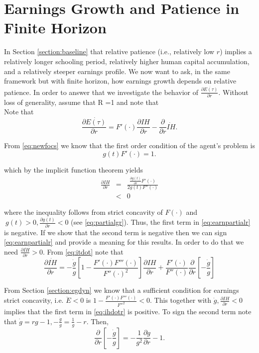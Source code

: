  
\section{Earnings Growth and Patience in Finite Horizon}
In Section \ref{section:baseline} that relative patience (i.e., relatively low $r$) implies a relatively longer schooling period, relatively higher human capital accumulation, and a relatively steeper earnings profile. We now want to ask, in the same framework but with finite horizon, how earnings growth depends on relative patience. In order to answer that we investigate the behavior of $\frac{\partial \dot{E(\tau)}}{\partial r}$. Without loss of generality, assume that R =1 and note that\\
\indent Note that
\begin{equation}
\frac{\partial \dot{E(\tau)} }{\partial r} = F'(\cdot) \frac{\partial IH}{\partial r} - \frac{\partial}{\partial r} \dot{IH}. \label{eq:earnpartialr}
\end{equation}

\noindent From \eqref{eq:newfocs} we know that the first order condition of the agent's problem is
\begin{equation}
g(t) F'(\cdot) = 1.
\end{equation}

\noindent which by the implicit function theorem yields
\begin{eqnarray}
\frac{\partial IH}{\partial r} &=& \frac{\frac{\partial g(t)}{\partial r} F'(\cdot)}{2 g(t) F''(\cdot)} \nonumber \\ 
&<& 0
\end{eqnarray}

\noindent where the inequality follows from strict concavity of $F(\cdot)$ and  $\ g(t) > 0, \frac{\partial g(t)}{ \partial r} <0$ (see \eqref{eq:partialgr}). Thus, the first term in \eqref{eq:earnpartialr} is negative. If we show that the second term is negative then we can sign \eqref{eq:earnpartialr} and provide a meaning for this results. In order to do that we need $\frac{\partial \dot{IH}}{\partial r} > 0$. From \eqref{eq:itdot} note that 
\begin{equation}
\frac{\partial \dot{IH}}{\partial r} = -\frac{\dot{g}}{g} \left[ 1 - \frac{F'(\cdot)F'''(\cdot)}{{F''(\cdot)}^2}\right] \frac{\partial IH}{\partial r} + \frac{F'(\cdot)}{F''(\cdot)}\frac{\partial}{\partial r} \left[ - \frac{\dot{g}}{g} \right] \label{eq:ihdotr}
\end{equation}

\indent From Section \ref{section:egdyn} we know that a sufficient condition for earnings strict concavity, i.e. $\ddot{E} < 0$ is $1 - \frac{F'(\cdot) F'''(\cdot)}{{F''}^2} < 0$. This together with $\dot{g}, \frac{\partial IH}{\partial r} < 0$ implies that the first term in \eqref{eq:ihdotr} is positive. To sign the second term note that $\dot{g} = rg - 1, - \frac{\dot{g}}{g} = \frac{1}{g} - r$. Then,
\begin{equation}
\frac{\partial}{\partial r} \left[ - \frac{\dot{g}}{g} \right] = - \frac{1}{g^2} \frac{\partial g}{\partial r} - 1. \label{eq:dotgg}
\end{equation}

